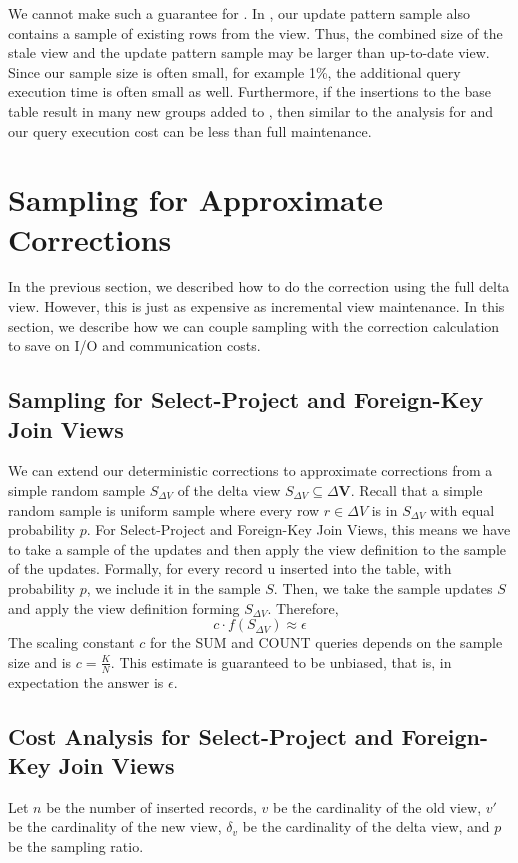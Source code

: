 We cannot make such a guarantee for \aggview.
In \aggview, our update pattern sample also contains a sample of existing rows from the view.
Thus, the combined size of the stale view and the update pattern sample may be larger than up-to-date view.
Since our sample size is often small, for example 1\%, the additional query execution time is often small as well.
Furthermore, if the insertions to the base table result in many new groups added to \aggview, then similar to the analysis 
for \fjview and \spview our query execution cost can be less than full maintenance.




\iffalse
\section{Sampling for Approximate Corrections}
In the previous section, we described how to do the correction using the full delta view.
However, this is just as expensive as incremental view maintenance.
In this section, we describe how we can couple sampling with the correction calculation to
save on I/O and communication costs. 

\subsection{Sampling for Select-Project and Foreign-Key Join Views}
We can extend our deterministic corrections to approximate corrections from a 
simple random sample $S_{\Delta V}$ of the delta view $S_{\Delta V}\subseteq\Delta\textbf{V}$. 
Recall that a simple random sample is uniform sample where every row $r\in\Delta V$
is in $S_{\Delta V}$ with equal probability $p$. For Select-Project
and Foreign-Key Join Views, this means we have to take a sample of
the updates and then apply the view definition to the sample of the
updates. Formally, for every record u inserted into the table, with
probability $p$, we include it in the sample $S$. Then, we take
the sample updates $S$ and apply the view definition forming $S_{\Delta V}$.
Therefore,
\[
c\cdot f(S_{\Delta V})\approx\epsilon
\]
The scaling constant $c$ for the SUM and COUNT queries
depends on the sample size and is $c = \frac{K}{N}$.
This estimate is guaranteed to be unbiased, that is, in expectation the answer is $\epsilon$.

\subsection{Cost Analysis for Select-Project and Foreign-Key Join Views}
Let $n$ be the number of inserted records, $v$ be the cardinality of the old view, $v'$ be the cardinality of the new view, $\delta_v$ be the cardinality of the delta view, and $p$ be the sampling ratio.  

